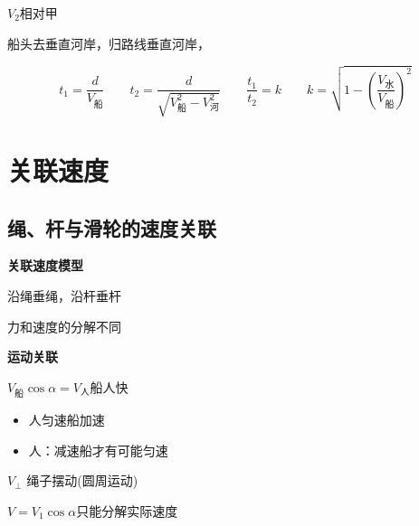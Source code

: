 
$V_2$相对甲


船头去垂直河岸，归路线垂直河岸，

\[ t_1=\frac{d}{V_{\text{船}}}\qquad t_2=\frac{d}{\sqrt{V_{\text{船}}^{2}-V_{\text{河}}^{2}}}\qquad \frac{t_1}{t_2}=k\qquad k=\sqrt{1-\left(\frac{V_{\text{水}}}{V_{\text{船}}}\right)^{2}} \]


\section{关联速度}
\subsection{绳、杆与滑轮的速度关联}
\textbf{关联速度模型}



沿绳垂绳，沿杆垂杆

力和速度的分解不同


\textbf{运动关联}%

\noindent $V_{\text{船}}\cos\alpha=V_{\text{人}}$\quad 船人快%

\begin{itemize}
\item 人匀速船加速
\item 人：减速船才有可能匀速
\end{itemize}

\noindent $V_{\perp}$ 绳子摆动(圆周运动)%

\noindent $V=V_1\cos\alpha$\qquad 只能分解实际速度

